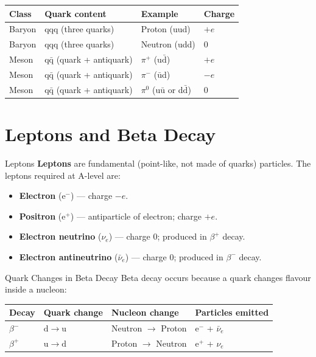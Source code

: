 \begin{center}
\renewcommand{\arraystretch}{1.5}
\begin{tabular}{@{} l l l l @{}}
\toprule
\textbf{Class} & \textbf{Quark content} & \textbf{Example} & \textbf{Charge} \\
\midrule
Baryon & qqq (three quarks) & Proton (uud) & $+e$ \\
Baryon & qqq (three quarks) & Neutron (udd) & $0$ \\
Meson  & q$\bar{\text{q}}$ (quark + antiquark) & $\pi^+$ (u$\bar{\text{d}}$) & $+e$ \\
Meson  & q$\bar{\text{q}}$ (quark + antiquark) & $\pi^-$ ($\bar{\text{u}}$d) & $-e$ \\
Meson  & q$\bar{\text{q}}$ (quark + antiquark) & $\pi^0$ (u$\bar{\text{u}}$ or d$\bar{\text{d}}$) & $0$ \\
\bottomrule
\end{tabular}
\end{center}

\section{Leptons and Beta Decay}

\begin{definitionbox}{Leptons}
\textbf{Leptons} are fundamental (point-like, not made of quarks) particles. The leptons required at A-level are:
\begin{itemize}[itemsep=2pt]
  \item \textbf{Electron} ($\mathrm{e}^-$) — charge $-e$.
  \item \textbf{Positron} ($\mathrm{e}^+$) — antiparticle of electron; charge $+e$.
  \item \textbf{Electron neutrino} ($\nu_e$) — charge $0$; produced in $\beta^+$ decay.
  \item \textbf{Electron antineutrino} ($\bar{\nu}_e$) — charge $0$; produced in $\beta^-$ decay.
\end{itemize}
\end{definitionbox}

\begin{keybox}{Quark Changes in Beta Decay}
Beta decay occurs because a quark changes flavour inside a nucleon:

\vspace{0.5em}
\begin{center}
\renewcommand{\arraystretch}{1.6}
\begin{tabular}{@{} l l l l @{}}
\toprule
\textbf{Decay} & \textbf{Quark change} & \textbf{Nucleon change} & \textbf{Particles emitted} \\
\midrule
$\beta^-$ & $\mathrm{d} \to \mathrm{u}$ & Neutron $\to$ Proton & $\mathrm{e}^-$ + $\bar{\nu}_e$ \\
$\beta^+$ & $\mathrm{u} \to \mathrm{d}$ & Proton $\to$ Neutron & $\mathrm{e}^+$ + $\nu_e$ \\
\bottomrule
\end{tabular}
\end{center}
\end{keybox}

